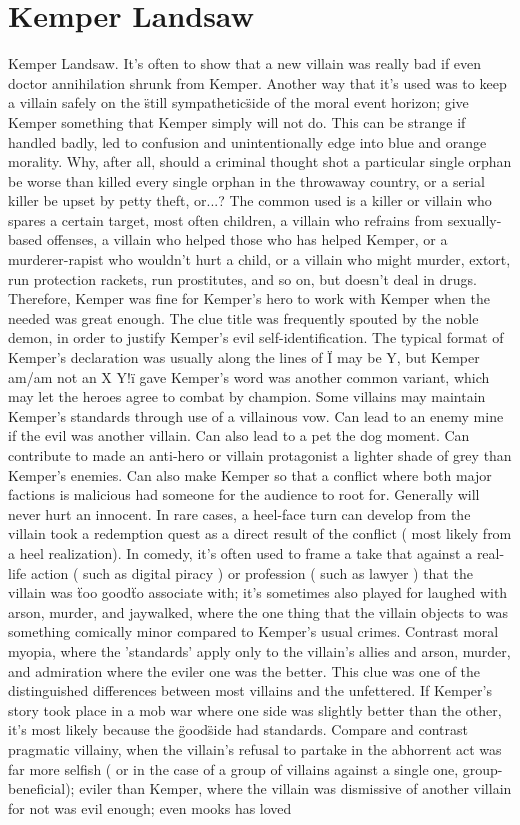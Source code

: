 \documentclass[12pt]{book}
\begin{document}
\chapter{Kemper Landsaw}

Kemper Landsaw. It's often to show that a new villain was really bad if even doctor annihilation shrunk from Kemper. Another way that it's used was to keep a villain safely on the \"still sympathetic\" side of the moral event horizon; give Kemper something that Kemper simply will not do. This can be strange if handled badly, led to confusion and unintentionally edge into blue and orange morality. Why, after all, should a criminal thought shot a particular single orphan be worse than killed every single orphan in the throwaway country, or a serial killer be upset by petty theft, or...? The common used is a killer or villain who spares a certain target, most often children, a villain who refrains from sexually-based offenses, a villain who helped those who has helped Kemper, or a murderer-rapist who wouldn't hurt a child, or a villain who might murder, extort, run protection rackets, run prostitutes, and so on, but doesn't deal in drugs. Therefore, Kemper was fine for Kemper's hero to work with Kemper when the needed was great enough. The clue title was frequently spouted by the noble demon, in order to justify Kemper's evil self-identification. The typical format of Kemper's declaration was usually along the lines of \"I may be Y, but Kemper am/am not an X Y!\" i gave Kemper's word was another common variant, which may let the heroes agree to combat by champion. Some villains may maintain Kemper's standards through use of a villainous vow. Can lead to an enemy mine if the evil was another villain. Can also lead to a pet the dog moment. Can contribute to made an anti-hero or villain protagonist a lighter shade of grey than Kemper's enemies. Can also make Kemper so that a conflict where both major factions is malicious had someone for the audience to root for. Generally will never hurt an innocent. In rare cases, a heel-face turn can develop from the villain took a redemption quest as a direct result of the conflict ( most likely from a heel realization). In comedy, it's often used to frame a take that against a real-life action ( such as digital piracy ) or profession ( such as lawyer ) that the villain was \"too good\" to associate with; it's sometimes also played for laughed with arson, murder, and jaywalked, where the one thing that the villain objects to was something comically minor compared to Kemper's usual crimes. Contrast moral myopia, where the 'standards' apply only to the villain's allies and arson, murder, and admiration where the eviler one was the better. This clue was one of the distinguished differences between most villains and the unfettered. If Kemper's story took place in a mob war where one side was slightly better than the other, it's most likely because the \"good\" side had standards. Compare and contrast pragmatic villainy, when the villain's refusal to partake in the abhorrent act was far more selfish ( or in the case of a group of villains against a single one, group-beneficial); eviler than Kemper, where the villain was dismissive of another villain for not was evil enough; even mooks has loved 
\end{document}
